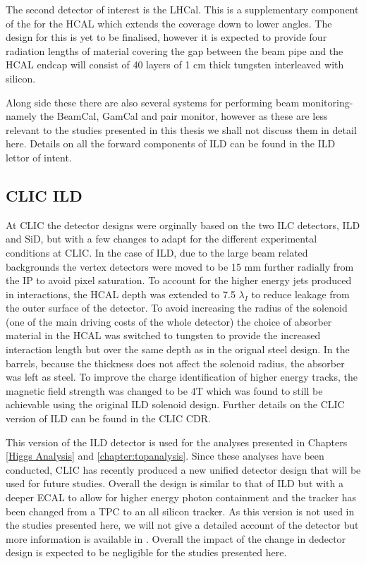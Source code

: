 The second detector of interest is the LHCal. This is a supplementary component of the for the \ac{HCAL} which extends the coverage down to lower angles. The design for this is yet to be finalised, however it is expected to provide four radiation lengths of material covering the gap between the beam pipe and the \ac{HCAL} endcap will consist of 40 layers of 1 cm thick tungsten interleaved with silicon.

Along side these there are also several systems for performing beam monitoring- namely the BeamCal, GamCal and pair monitor, however as these are less relevant to the studies presented in this thesis we shall not discuss them in detail here. Details on all the forward components of \ac{ILD} can be found in the \ac{ILD} lettor of intent\cite{ILD}.


\subsection{CLIC ILD}

At \ac{CLIC} the detector designs were orginally based on the two \ac{ILC} detectors, \ac{ILD} and \ac{SiD}, but with a few changes to adapt for the different experimental conditions at \ac{CLIC}. In the case of \ac{ILD}, due to the large beam related backgrounds the vertex detectors were moved to be 15 mm further radially from the \ac{IP} to avoid pixel saturation. To account for the higher energy jets produced in interactions, the \ac{HCAL} depth was extended to 7.5 $\lambda_I$ to reduce leakage from the outer surface of the detector. To avoid increasing the radius of the solenoid (one of the main driving costs of the whole detector) the choice of absorber material in the \ac{HCAL} was switched to tungsten to provide the increased interaction length but over the same depth as in the orignal steel design. In the barrels, because the thickness does not affect the solenoid radius, the absorber was left as steel. To improve the charge identification of higher energy tracks, the magnetic field strength was changed to be 4T which was found to still be achievable using the original \ac{ILD} solenoid design. Further details on the CLIC version of \ac{ILD} can be found in the \ac{CLIC} \ac{CDR}\cite{CDR}.

This version of the \ac{ILD} detector is used for the analyses presented in Chapters \ref{Higgs Analysis} and \ref{chapter:topanalysis}. Since these analyses have been conducted, \ac{CLIC} has recently produced a new unified detector design that will be used for future studies. Overall the design is similar to that of \ac{ILD} but with a deeper \ac{ECAL} to allow for higher energy photon containment and the tracker has been changed from a \ac{TPC} to an all silicon tracker. As this version is not used in the studies presented here, we will not give a detailed account of the detector but more information is available in \cite{Pitters:2018jxt}. Overall the impact of the change in dedector design is expected to be negligible for the studies presented here.






